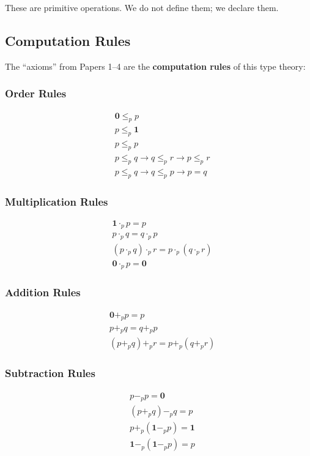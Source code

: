 \documentclass[11pt,a4paper]{article}
\newcommand{\pzero}{\mathbf{0}}
\newcommand{\pone}{\mathbf{1}}
\newcommand{\ple}{\leq_p}
\newcommand{\padd}{+_p}
\newcommand{\pmul}{\cdot_p}
\newcommand{\psub}{-_p}
\begin{document}
These are primitive operations. We do not define them; we declare them.

\subsection{Computation Rules}

The ``axioms'' from Papers 1--4 are the \textbf{computation rules} of this type theory:

\subsubsection*{Order Rules}
\begin{align}
&\pzero \ple p \tag{zero-least} \\
&p \ple \pone \tag{one-greatest} \\
&p \ple p \tag{refl} \\
&p \ple q \to q \ple r \to p \ple r \tag{trans} \\
&p \ple q \to q \ple p \to p = q \tag{antisymm}
\end{align}

\subsubsection*{Multiplication Rules}
\begin{align}
&\pone \pmul p = p \tag{one-mul} \\
&p \pmul q = q \pmul p \tag{mul-comm} \\
&(p \pmul q) \pmul r = p \pmul (q \pmul r) \tag{mul-assoc} \\
&\pzero \pmul p = \pzero \tag{zero-mul}
\end{align}

\subsubsection*{Addition Rules}
\begin{align}
&\pzero \padd p = p \tag{zero-add} \\
&p \padd q = q \padd p \tag{add-comm} \\
&(p \padd q) \padd r = p \padd (q \padd r) \tag{add-assoc}
\end{align}

\subsubsection*{Subtraction Rules}
\begin{align}
&p \psub p = \pzero \tag{sub-self} \\
&(p \padd q) \psub q = p \tag{add-sub-cancel} \\
&p \padd (\pone \psub p) = \pone \tag{complement} \\
&\pone \psub (\pone \psub p) = p \tag{double-neg}
\end{align}
\end{document}
